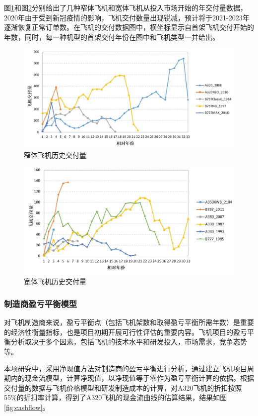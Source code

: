 \documentclass[12pt,a4paper]{report}
\begin{document}
图\ref{fig:narrow-body-delivery}和图\ref{fig:wide-body-delivery}分别给出了几种窄体飞机和宽体飞机从投入市场开始的年交付量数据，2020年由于受到新冠疫情的影响，飞机交付数量出现锐减，预计将于2021-2023年逐渐恢复正常订单数。在飞机的交付数据图中，横坐标显示自首架飞机交付开始的年数，同时，每一种机型的首架交付年份在图中和飞机类型一并给出。

\begin{figure}[!htp]
  \centering
  \includegraphics[width=.8\textwidth]{eps/NarrowbodyDelivery.jpg}
  \caption{窄体飞机历史交付量}
 \label{fig:narrow-body-delivery}
\end{figure}

\begin{figure}[!htp]
  \centering
  \includegraphics[width=.8\textwidth]{eps/WidebodyDelivery.jpg}
  \caption{宽体飞机历史交付量}
 \label{fig:wide-body-delivery}
\end{figure}

\subsubsection{制造商盈亏平衡模型}

对飞机制造商来说，盈亏平衡点（包括飞机架数和取得盈亏平衡所需年数）是重要的经济性衡量指标，也是项目初期开展可行性评估的重要内容。飞机项目的盈亏平衡分析取决于多个因素，包括飞机的技术水平和研发投入，市场需求，竞争态势等。

本项研究中，采用净现值方法对制造商的盈亏平衡进行分析，通过建立飞机项目周期内的现金流模型，计算净现值，以净现值等于零作为盈亏平衡计算的依据。根据交付量的数据与飞机价格模型和研发制造成本的计算，对A320飞机的折扣按照55\%的折扣率\cite{discount}计算，得到了A320飞机的现金流曲线的估算结果，结果如图\ref{fig:cashflow}。
\end{document}

